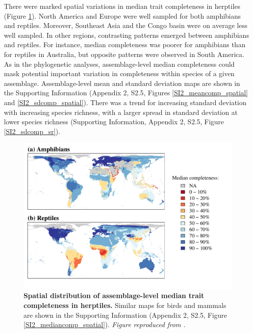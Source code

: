 There were marked spatial variations in median trait completeness in herptiles (Figure \ref{2_Map}). North America and Europe were well sampled for both amphibians and reptiles. Moreover, Southeast Asia and the Congo basin were on average less well sampled. In other regions, contrasting patterns emerged between amphibians and reptiles. For instance, median completeness was poorer for amphibians than for reptiles in Australia, but opposite patterns were observed in South America. As in the phylogenetic analyses, assemblage-level median completeness could mask potential important variation in completeness within species of a given assemblage. Assemblage-level mean and standard deviation maps are shown in the Supporting Information (Appendix 2, S2.5, Figures \ref{SI2_meancomp_spatial} and \ref{SI2_sdcomp_spatial}). There was a trend for increasing standard deviation with increasing species richness, with a larger spread in standard deviation at lower species richness (Supporting Information, Appendix 2, S2.5, Figure \ref{SI2_sdcomp_sr}).

\clearpage

\begin{figure}[h!]
\centering
\includegraphics[scale=0.7]{figures/Chapter1/Figure_5}
\caption[Spatial distribution of assemblage-level median trait completeness in herptiles.]{\textbf{Spatial distribution of assemblage-level median trait completeness in herptiles.} Similar maps for birds and mammals are shown in the Supporting Information (Appendix 2, S2.5, Figure \ref{SI2_mediancomp_spatial}). \textit{Figure reproduced from \citet{Etard2020}.}}
\label{2_Map}
\end{figure}


